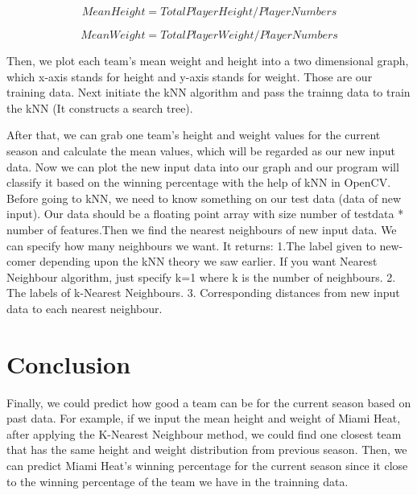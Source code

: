\documentclass[twoside]{article}
\begin{document}
\begin{multicols}{2}
\begin{equation}
\label{}
Mean Height = Total Player Height/Player Numbers
\end{equation}

\begin{equation}
\label{}
Mean Weight = Total Player Weight/Player Numbers
\end{equation}

Then, we plot each team's mean weight and height into a two dimensional graph, which x-axis stands for height and y-axis stands for weight. Those are our training data. Next initiate the kNN algorithm and pass the trainng data to train the kNN (It constructs a search tree).

After that, we can grab one team's height and weight values for the current season and calculate the mean values, which will be regarded as our new input data. Now we can plot the new input data into our graph and our program will classify it based on the winning percentage with the help of kNN in OpenCV. Before going to kNN, we need to know something on our test data (data of new input). Our data should be a floating point array with size number of testdata * number of features.Then we find the nearest neighbours of new input data. We can specify how many neighbours we want. It returns:
1.The label given to new-comer depending upon the kNN theory we saw earlier. If you want Nearest Neighbour algorithm, just specify k=1 where k is the number of neighbours.
2. The labels of k-Nearest Neighbours.
3. Corresponding distances from new input data to each nearest neighbour.





\section{Conclusion}

Finally, we could predict how good a team can be for the current season based on past data. For example, if we input the mean height and weight of Miami Heat, after applying the K-Nearest Neighbour method, we could find one closest team that has the same height and weight distribution from previous season. Then, we can predict Miami Heat's winning percentage for the current season since it close to the winning percentage of the team we have in the trainning data.



\end{multicols}
\end{document}
